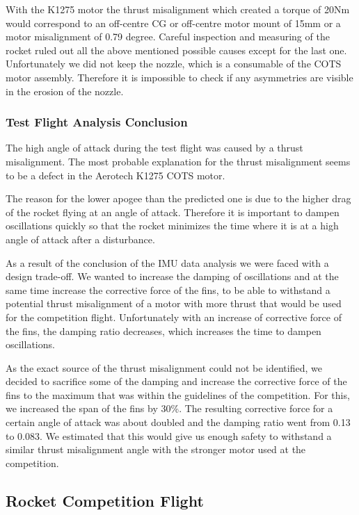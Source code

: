 With the K1275 motor the thrust misalignment which created a torque of 20Nm would correspond to an off-centre CG or off-centre motor mount of 15mm or a motor misalignment of 0.79 degree.
Careful inspection and measuring of the rocket ruled out all the above mentioned possible causes except for the last one. Unfortunately we did not keep the nozzle, which is a consumable of the COTS motor assembly. Therefore it is impossible to check if any asymmetries are visible in the erosion of the nozzle.

\subsubsection{Test Flight Analysis Conclusion}

The high angle of attack during the test flight was caused by a thrust misalignment. The most probable explanation for the thrust misalignment seems to be a defect in the Aerotech K1275 COTS motor.

The reason for the lower apogee than the predicted one is due to the higher drag of the rocket flying at an angle of attack. Therefore it is important to dampen oscillations quickly so that the rocket minimizes the time where it is at a high angle of attack after a disturbance.

As a result of the conclusion of the IMU data analysis we were faced with a design trade-off.
We wanted to increase the damping of oscillations and at the same time increase the corrective force of the fins, to be able to withstand a potential thrust misalignment of a motor with more thrust that would be used for the competition flight.
Unfortunately with an increase of corrective force of the fins, the damping ratio decreases, which increases the time to dampen oscillations.

As the exact source of the thrust misalignment could not be identified, we decided to sacrifice some of the damping and increase the corrective force of the fins to the maximum that was within the guidelines of the competition.
For this, we increased the span of the fins by 30\%. The resulting corrective force for a certain angle of attack was about doubled and the damping ratio went from 0.13 to 0.083.
We estimated that this would give us enough safety to withstand a similar thrust misalignment angle with the stronger motor used at the competition.

\subsection{Rocket Competition Flight}

